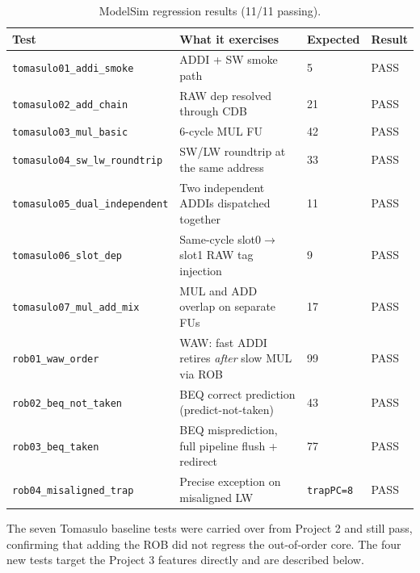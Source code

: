 \documentclass[11pt]{article}
\begin{document}
\begin{table}[h]
  \centering
  \small
  \begin{tabular}{l l l l}
    \toprule
    \textbf{Test}                          & \textbf{What it exercises}                           & \textbf{Expected} & \textbf{Result} \\
    \midrule
    \texttt{tomasulo01\_addi\_smoke}       & ADDI + SW smoke path                                 & 5                 & PASS            \\
    \texttt{tomasulo02\_add\_chain}        & RAW dep resolved through CDB                         & 21                & PASS            \\
    \texttt{tomasulo03\_mul\_basic}        & 6-cycle MUL FU                                       & 42                & PASS            \\
    \texttt{tomasulo04\_sw\_lw\_roundtrip} & SW/LW roundtrip at the same address                  & 33                & PASS            \\
    \texttt{tomasulo05\_dual\_independent} & Two independent ADDIs dispatched together            & 11                & PASS            \\
    \texttt{tomasulo06\_slot\_dep}         & Same-cycle slot0$\to$slot1 RAW tag injection         & 9                 & PASS            \\
    \texttt{tomasulo07\_mul\_add\_mix}     & MUL and ADD overlap on separate FUs                  & 17                & PASS            \\
    \midrule
    \texttt{rob01\_waw\_order}             & WAW: fast ADDI retires \emph{after} slow MUL via ROB & 99                & PASS            \\
    \texttt{rob02\_beq\_not\_taken}        & BEQ correct prediction (predict-not-taken)           & 43                & PASS            \\
    \texttt{rob03\_beq\_taken}             & BEQ misprediction, full pipeline flush + redirect    & 77                & PASS            \\
    \texttt{rob04\_misaligned\_trap}       & Precise exception on misaligned LW                   & \texttt{trapPC=8} & PASS            \\
    \bottomrule
  \end{tabular}
  \caption{ModelSim regression results (11/11 passing).}
  \label{tbl:suite_results}
\end{table}

The seven Tomasulo baseline tests were carried over from Project 2 and still
pass, confirming that adding the ROB did not regress the out-of-order core.
The four new tests target the Project 3 features directly and are described
below.
\end{document}
